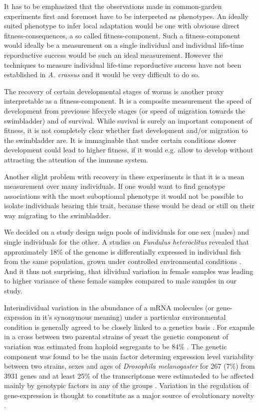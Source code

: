 It has to be emphasized that the observations made in common-garden
experiments first and foremost have to be interpreted as
phenotypes. An ideally suited phenotype to infer local adaptation
would be one with obviouse direct fitness-consequences, a so called
fitness-component. Such a fitness-component would ideally be a
measurement on a single individual and individual life-time
reporductive success would be such an ideal measurement. However the
techniques to measure individual life-time reporductive success have
not been established in \textit{A. crassus} and it would be very
difficult to do so.

The recovery of certain developmental stages of worms is another proxy
interpretable as a fitness-component. It is a composite measurement
the speed of development from previouse lifecycle stages (or speed of
migration towards the swimbladder) and of survival. While suvival is
surely an important component of fitness, it is not completely clear
whether fast development and/or migration to the swimbladder are. It
is immaginable that under certain conditions slower development could
lead to higher fitness, if it would e.g. allow to develop without
attracting the attention of the immune system.

Another slight problem with recovery in these experiments is that it
is a mean measurement over many individuals. If one would want to find
genotype associations with the most suboptiomal phenotype it would not
be possible to isolate individuals bearing this trait, because these
would be dead or still on their way migrating to the swimbladder.

We decided on a study design usign pools of individuals for one sex
(males) and single individuals for the other. A studies on
\textit{Fundulus heteroclitus} revealed that approximately 18\% of the
genome is differentially expressed in individual fish from the same
population, grown under controlled environmental conditions
\cite{pmid12219088}. And it thus not surprising, that idividual
variation in female samples was leading to higher variance of these
female samples compared to male samples in our study.

Interindividual variation in the abundance of a mRNA molecules (or
gene-exprssion in it's synonymous meaning) under a particular
environmental condition is generally agreed to be closely linked to a
genetics basis \cite{pmid15498452}. For exapmle in a cross between two
parental strains of yeast the genetic component of variation was
estimated from haploid segregants to be 84\% \cite{pmid11923494}. The
genetic component was found to be the main factor determing expression
level variability between two strains, sexes and ages of
\textit{Drosophila melanogaster} for 267 (7\%) from 3931 genes and at
least 25\% of the transcriptome were estimateded to be affected mainly
by genotypic factors in any of the groups
\cite{pmid11726925}. Variation in the regulation of gene-expression is
thought to constitute as a major source of evolutionary novelty
\cite{pmid11341673}.

